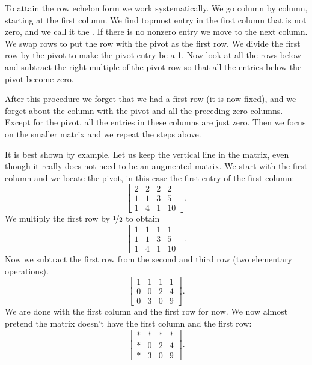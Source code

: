 To attain the row echelon form we work systematically.
We go column by column, starting at the first column.  We find topmost
entry in the first column that is not zero, and we call it the
\emph{}.  If there is no nonzero entry
we move to the next column.  We swap rows to put the row with
the pivot as the first row.  We divide the first row
by the pivot to make the pivot entry be a 1.  Now look at all the rows below
and subtract the right multiple of the pivot row so that all the entries
below the pivot become zero.

After this procedure we forget that we had a first row (it is now fixed),
and we forget about the column with the pivot and all the preceding zero
columns.
Except for the pivot, all the entries in these columns are just
zero.  Then we focus on the smaller matrix and we repeat the steps
above.

It is best shown by example.  Let us keep the vertical line in the matrix,
even though it really does not need to be an augmented matrix.
We start with the first column and we locate the pivot, in this
case the first entry of the first column:
\begin{equation*}
\left[
\begin{array}{ccc|c}
\boxed{2} & 2 & 2 & 2 \\
1 & 1 & 3 & 5 \\
1 & 4 & 1 & 10
\end{array}
\right] .
\end{equation*}
We multiply the first row by
$\nicefrac{1}{2}$ to obtain
\begin{equation*}
\left[
\begin{array}{ccc|c}
\boxed{1} & 1 & 1 & 1 \\
1 & 1 & 3 & 5 \\
1 & 4 & 1 & 10
\end{array}
\right] .
\end{equation*}
Now we subtract the first row from the second and third row (two elementary
operations).
\begin{equation*}
\left[
\begin{array}{ccc|c}
1 & 1 & 1 & 1 \\
0 & 0 & 2 & 4 \\
0 & 3 & 0 & 9
\end{array}
\right] .
\end{equation*}
We are done with the first column and the first row for now.  We now almost
pretend the matrix doesn't have the first column and the first row:
\begin{equation*}
\left[
\begin{array}{ccc|c}
* & * & * & * \\
* & 0 & 2 & 4 \\
* & 3 & 0 & 9
\end{array}
\right] .
\end{equation*}

